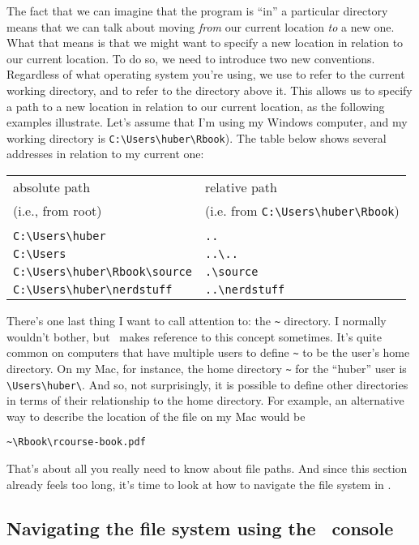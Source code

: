 The fact that we can imagine that the program is ``in'' a particular directory means that we can talk about moving {\it from} our current location {\it to} a new one. What that means is that we might want to specify a new location in relation to our current location. To do so, we need to introduce two new conventions. Regardless of what operating system you're using, we use  to refer to the current working directory, and  to refer to the directory above it. This allows us to specify a path to a new location in relation to our current location, as the following examples illustrate. Let's assume that I'm using my Windows computer, and my working directory is \verb#C:\Users\huber\Rbook#). The table below shows several addresses in relation to my current one:
\begin{center}
\begin{tabular}{l|l}
absolute path  & relative path \\ 
(i.e., from root)  & (i.e. from \verb#C:\Users\huber\Rbook#) \\[4pt] \hline \\[-12pt]
\verb#C:\Users\huber# & \verb#..# \\
\verb#C:\Users# & \verb#..\..# \\
\verb#C:\Users\huber\Rbook\source# & \verb#.\source# \\
\verb#C:\Users\huber\nerdstuff# & \verb#..\nerdstuff# \\
\end{tabular}
\end{center}


There's one last thing I want to call attention to: the \verb#~# directory. I normally wouldn't bother, but \R\ makes reference to this concept sometimes. It's quite common on computers that have multiple users to define \verb#~# to be the user's home directory. On my Mac, for instance, the home directory \verb#~# for the ``huber'' user is \verb#\Users\huber\#. And so, not surprisingly, it is possible to define other directories in terms of their relationship to the home directory. For example, an alternative way to describe the location of the  file on my Mac would be 
\begin{verbatim}
~\Rbook\rcourse-book.pdf
\end{verbatim}
That's about all you really need to know about file paths. And since this section already feels too long, it's time to look at how to navigate the file system in \R. 

\subsection{Navigating the file system using the \R\ console~\label{sec:navigationR}}

